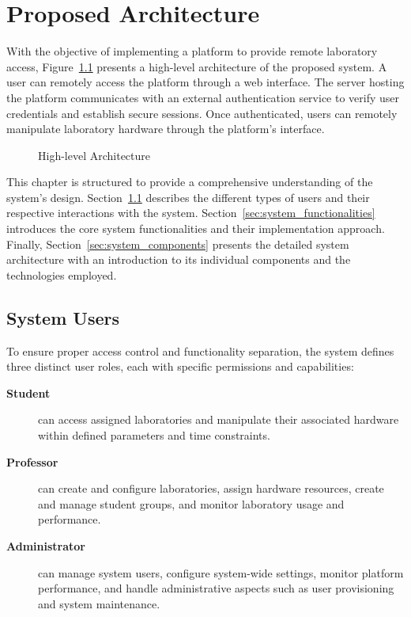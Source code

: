 %
%
\chapter{Proposed Architecture}\label{cap:proposed-architecture}

With the objective of implementing a platform to provide remote laboratory access, Figure~\ref{fig:architecture} presents a high-level architecture of the proposed system. A user can remotely access the platform through a web interface. The server hosting the platform communicates with an external authentication service to verify user credentials and establish secure sessions. Once authenticated, users can remotely manipulate laboratory hardware through the platform's interface.

\vspace{5mm}

\begin{figure}[H]
    \centering
    
\caption{High-level Architecture}
\label{fig:architecture}
\end{figure}

This chapter is structured to provide a comprehensive understanding of the system's design. Section~\ref{sec:user_role} describes the different types of users and their respective interactions with the system. Section~\ref{sec:system_functionalities} introduces the core system functionalities and their implementation approach. Finally, Section~\ref{sec:system_components} presents the detailed system architecture with an introduction to its individual components and the technologies employed.

\section{System Users}\label{sec:user_role}
To ensure proper access control and functionality separation, the system defines three distinct user roles, each with specific permissions and capabilities:

\begin{description}
    \item[\textbf{Student}] can access assigned laboratories and manipulate their associated hardware within defined parameters and time constraints.
    \item[\textbf{Professor}] can create and configure laboratories, assign hardware resources, create and manage student groups, and monitor laboratory usage and performance.
    \item[\textbf{Administrator}] can manage system users, configure system-wide settings, monitor platform performance, and handle administrative aspects such as user provisioning and system maintenance.
\end{description}

